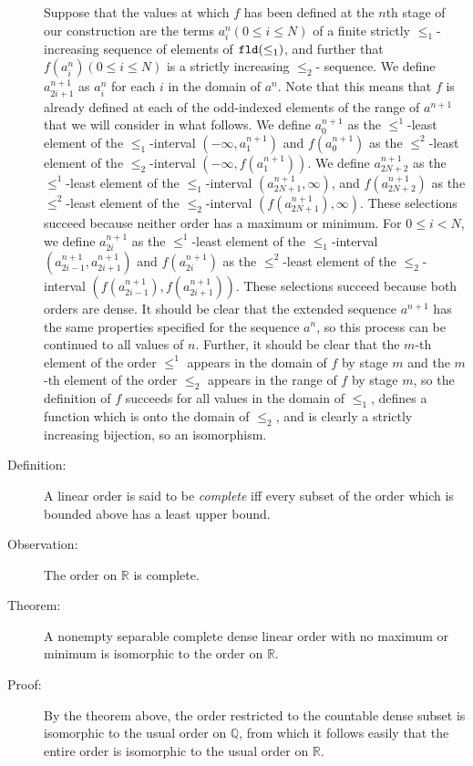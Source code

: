 \documentclass[12pt]{book}
\begin{document}
\begin{description}
Suppose that the values at which $f$ has been defined at the $n$th
stage of our construction are the terms $a^n_i (0 \leq i \leq N)$ of a
finite strictly $\leq_1$-increasing sequence of elements of ${\tt
fld}(\leq_1)$, and further that $f(a^n_i) (0 \leq i \leq N)$ is a
strictly increasing $\leq_2$- sequence.  We define $a^{n+1}_{2i+1}$ as
$a^n_i$ for each $i$ in the domain of $a^n$.  Note that this means
that $f$ is already defined at each of the odd-indexed elements of the
range of $a^{n+1}$ that we will consider in what follows.  We define
$a^{n+1}_0$ as the $\leq^1$-least element of the $\leq_1$-interval
$(-\infty,a^{n+1}_1)$ and $f(a^{n+1}_0)$ as the $\leq^2$-least element
of the $\leq_2$-interval $(-\infty,f(a^{n+1}_1))$.  We define
$a^{n+1}_{2N+2}$ as the $\leq^1$-least element of the
$\leq_1$-interval $(a^{n+1}_{2N+1},\infty)$, and $f(a^{n+1}_{2N+2})$
as the $\leq^2$-least element of the $\leq_2$-interval
$(f(a^{n+1}_{2N+1}),\infty)$.  These selections succeed because
neither order has a maximum or minimum.  For $0 \leq i <N$, we define
$a^{n+1}_{2i}$ as the $\leq^1$-least element of the $\leq_1$-interval
$(a^{n+1}_{2i-1},a^{n+1}_{2i+1})$ and $f(a^{n+1}_{2i})$ as the
$\leq^2$-least element of the $\leq_2$-interval
$(f(a^{n+1}_{2i-1}),f(a^{n+1}_{2i+1}))$.  These selections succeed
because both orders are dense.  It should be clear that the extended
sequence $a^{n+1}$ has the same properties specified for the sequence
$a^n$, so this process can be continued to all values of $n$.
Further, it should be clear that the $m$-th element of the order
$\leq^1$ appears in the domain of $f$ by stage $m$ and the $m$-th
element of the order $\leq_2$ appears in the range of $f$ by stage
$m$, so the definition of $f$ succeeds for all values in the domain of
$\leq_1$, defines a function which is onto the domain of $\leq_2$, and
is clearly a strictly increasing bijection, so an isomorphism.

\item[Definition:] A linear order is said to be {\em complete\/} iff
every subset of the order which is bounded above has a least upper
bound.

\item[Observation:]  The order on ${\mathbb R}$ is complete.

\item[Theorem:] A nonempty separable complete dense linear order with
no maximum or minimum is isomorphic to the order on $\mathbb R$.

\item[Proof:] By the theorem above, the order restricted to the
countable dense subset is isomorphic to the usual order on ${\mathbb
Q}$, from which it follows easily that the entire order is isomorphic
to the usual order on ${\mathbb R}$.

\end{description}
\end{document}
